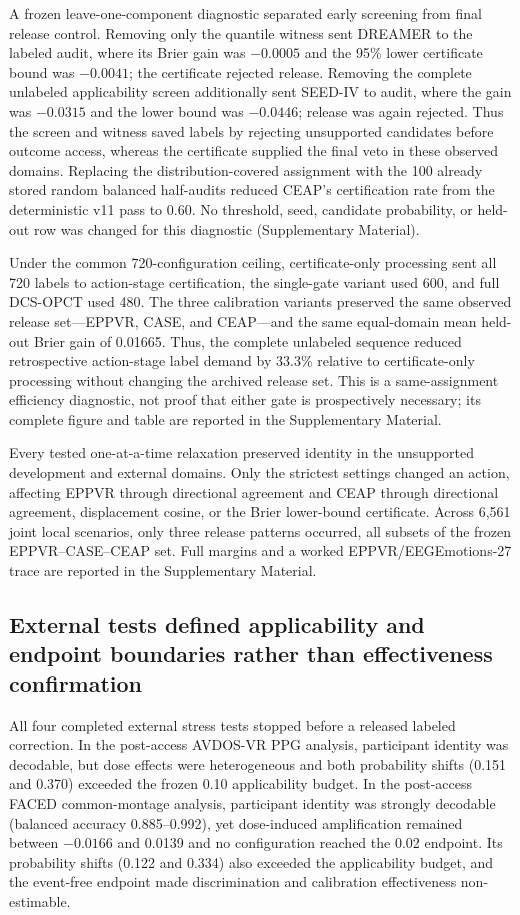 \documentclass[preprint,12pt]{elsarticle}
\begin{document}
A frozen leave-one-component diagnostic separated early screening from final release control. Removing only the quantile witness sent DREAMER to the labeled audit, where its Brier gain was $-0.0005$ and the 95\% lower certificate bound was $-0.0041$; the certificate rejected release. Removing the complete unlabeled applicability screen additionally sent SEED-IV to audit, where the gain was $-0.0315$ and the lower bound was $-0.0446$; release was again rejected. Thus the screen and witness saved labels by rejecting unsupported candidates before outcome access, whereas the certificate supplied the final veto in these observed domains. Replacing the distribution-covered assignment with the 100 already stored random balanced half-audits reduced CEAP's certification rate from the deterministic v11 pass to 0.60. No threshold, seed, candidate probability, or held-out row was changed for this diagnostic (Supplementary Material).

Under the common 720-configuration ceiling, certificate-only processing sent all 720 labels to action-stage certification, the single-gate variant used 600, and full DCS-OPCT used 480. The three calibration variants preserved the same observed release set---EPPVR, CASE, and CEAP---and the same equal-domain mean held-out Brier gain of 0.01665. Thus, the complete unlabeled sequence reduced retrospective action-stage label demand by 33.3\% relative to certificate-only processing without changing the archived release set. This is a same-assignment efficiency diagnostic, not proof that either gate is prospectively necessary; its complete figure and table are reported in the Supplementary Material.

Every tested one-at-a-time relaxation preserved identity in the unsupported development and external domains. Only the strictest settings changed an action, affecting EPPVR through directional agreement and CEAP through directional agreement, displacement cosine, or the Brier lower-bound certificate. Across 6,561 joint local scenarios, only three release patterns occurred, all subsets of the frozen EPPVR--CASE--CEAP set. Full margins and a worked EPPVR/EEGEmotions-27 trace are reported in the Supplementary Material.

\subsection{External tests defined applicability and endpoint boundaries rather than effectiveness confirmation}

All four completed external stress tests stopped before a released labeled correction. In the post-access AVDOS-VR PPG analysis, participant identity was decodable, but dose effects were heterogeneous and both probability shifts (0.151 and 0.370) exceeded the frozen 0.10 applicability budget. In the post-access FACED common-montage analysis, participant identity was strongly decodable (balanced accuracy 0.885--0.992), yet dose-induced amplification remained between $-0.0166$ and 0.0139 and no configuration reached the 0.02 endpoint. Its probability shifts (0.122 and 0.334) also exceeded the applicability budget, and the event-free endpoint made discrimination and calibration effectiveness non-estimable.
\end{document}
